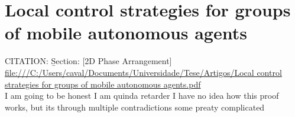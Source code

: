 \section{Local control strategies for groups of mobile autonomous agents}\label{Local control strategies for groups of mobile autonomous agents}
CITATION: \cite{1284730} \b{Section: [2D Phase Arrangement]}\\
\url{file:///C:/Users/caval/Documents/Universidade/Tese/Artigos/Local control strategies for groups of mobile autonomous agents.pdf}\\

I am going to be honest I am quinda retarder I have no idea how this proof works, but its through multiple contradictions some preaty complicated